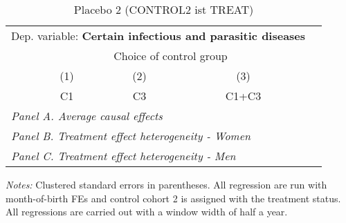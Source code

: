  \begin{table}[H] \centering \begin{threeparttable} \caption{Placebo 2 (CONTROL2 ist TREAT) } {\def\sym#1{\ifmmode^{#1}\else\(^{#1}\)\fi} \begin{tabular}{l*{4}{c}} \toprule \multicolumn{4}{l}{Dep. variable: \textbf{Certain infectious and parasitic diseases}} \\ & \multicolumn{3}{c}{Choice of control group} \\ \cmidrule(lr){2-4}
            &\multicolumn{1}{c}{(1)}&\multicolumn{1}{c}{(2)}&\multicolumn{1}{c}{(3)}\\
            &\multicolumn{1}{c}{C1}&\multicolumn{1}{c}{C3}&\multicolumn{1}{c}{C1+C3}\\
\midrule
 \multicolumn{4}{l}{\emph{Panel A. Average causal effects}} \\      \midrule\multicolumn{4}{l}{\emph{Panel B. Treatment effect heterogeneity - Women}} \\      \midrule\multicolumn{4}{l}{\emph{Panel C. Treatment effect heterogeneity - Men}} \\      
\bottomrule \end{tabular} } \begin{tablenotes} \item \scriptsize \emph{Notes:} Clustered standard errors in parentheses. All regression are run with month-of-birth FEs and control cohort 2 is assigned with the treatment status. All regressions are carried out with a window width of half a year. \end{tablenotes} \end{threeparttable} \end{table} 
